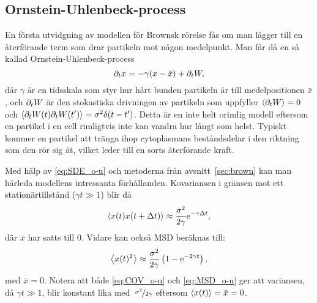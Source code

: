 \subsection{Ornstein-Uhlenbeck-process}
En första utvidgning av modellen för Brownsk rörelse fås om man lägger till en återförande term som drar partikeln mot någon medelpunkt. Man får då en så kallad Ornstein-Uhlenbeck-process
\begin{equation}\label{eq:SDE_o-u}
\partial_t x = -\gamma ( x-\bar{x} ) + \partial_t W,
\end{equation}
där $\gamma$ är en tidsskala som styr hur hårt bunden partikeln är till medelpositionen $\bar{x}$, och $\partial_t W$ är den stokastiska drivningen av partikeln som uppfyller $\ev{\pd_t W}=0$ och $\ev{\pd_t W(t)\pd_t W(t')} = \sigma^2\delta(t-t')$. Detta är en inte helt orimlig modell eftersom en partikel i en cell rimligtvis inte kan vandra hur långt som helst. Typiskt kommer en partikel att tränga ihop cytoplasmans beståndsdelar i den riktning som den rör sig åt, vilket leder till en sorts återförande kraft.

Med hälp av \eqref{eq:SDE_o-u} och metoderna från avsnitt~\ref{sec:brown} kan man härleda modellens intressanta förhållanden. Kovariansen i gränsen mot ett stationärtillstånd ($\gamma t\gg 1$) blir då
\begin{equation}\label{eq:COV_o-u}
\ev{x(t)x(t+\Delta{t})} \approx \frac{\sigma^2}{2\gamma} \ee^{-\gamma\Delta{t}},
\end{equation}
där $\bar{x}$ har satts till 0. Vidare kan också MSD beräknas till:
\begin{equation}\label{eq:MSD_o-u}
\ev{x(t)^2} 
\approx \frac{\sigma^2}{2\gamma} \left( 1-\ee^{-2\gamma t} \right),
\end{equation}
med $\bar{x}=0$. Notera att både \eqref{eq:COV_o-u} och \eqref{eq:MSD_o-u} ger att variansen, då $\gamma t\gg 1$, blir konstant lika med~$\nicefrac{\sigma^2}{2\gamma}$ eftersom $\ev{x(t)}=\bar{x}=0$.


  
